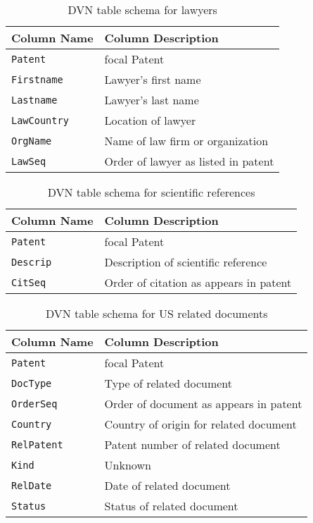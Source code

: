 \begin{table}[ht]
\center
\begin{tabular}{| l | l |}
\hline
Column Name & Column Description \\
\hline
\verb`Patent` & focal Patent \\
\verb`Firstname` & Lawyer's first name \\
\verb`Lastname` & Lawyer's last name \\
\verb`LawCountry` & Location of lawyer \\
\verb`OrgName` & Name of law firm or organization \\
\verb`LawSeq` & Order of lawyer as listed in patent \\
\hline
\end{tabular}
\caption{DVN table schema for lawyers}
\end{table}

\begin{table}[ht]
\center
\begin{tabular}{| l | l |}
\hline
Column Name & Column Description \\
\hline
\verb`Patent` & focal Patent \\
\verb`Descrip` & Description of scientific reference \\
\verb`CitSeq` & Order of citation as appears in patent \\
\hline
\end{tabular}
\caption{DVN table schema for scientific references}
\end{table}

\begin{table}[ht]
\center
\begin{tabular}{| l | l |}
\hline
Column Name & Column Description \\
\hline
\verb`Patent` & focal Patent \\
\verb`DocType` & Type of related document \\
\verb`OrderSeq` & Order of document as appears in patent \\
\verb`Country` & Country of origin for related document \\
\verb`RelPatent` & Patent number of related document \\
\verb`Kind` & Unknown \\
\verb`RelDate` & Date of related document \\
\verb`Status` & Status of related document \\
\hline
\end{tabular}
\caption{DVN table schema for US related documents}
\end{table}
